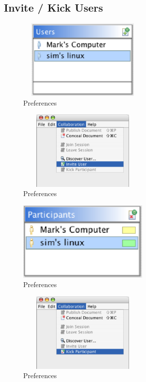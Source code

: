 \documentclass[11pt,a4paper]{article}
\begin{document}
\subsection{Invite / Kick Users}
\begin{figure}[H]
\begin{center}
  \includegraphics[height=1.56in, width=2.56in]{../images/usermanual/uview_invite.bmp.eps}
\caption{Preferences}
\label{default}
\end{center}
\end{figure}
\begin{figure}[H]
\begin{center}
  \includegraphics[height=1.56in, width=2.56in]{../images/usermanual/nmenu_collaboration_invite.bmp.eps}
\caption{Preferences}
\label{default}
\end{center}
\end{figure}
\begin{figure}[H]
\begin{center}
  \includegraphics[height=1.56in, width=2.56in]{../images/usermanual/pview_kick.bmp.eps}
\caption{Preferences}
\label{default}
\end{center}
\end{figure}
\begin{figure}[H]
\begin{center}
  \includegraphics[height=1.56in, width=2.56in]{../images/usermanual/nmenu_collaboration_kick.bmp.eps}
\caption{Preferences}
\label{default}
\end{center}
\end{figure}
\end{document}
